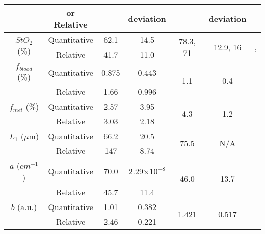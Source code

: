 \begin{subappendices}
\begin{table}[h]
\begin{tabular}{|c|ccc|ccc|}
         & or Relative &  & deviation &  & deviation &  \\
        \hline
        \multirow{2}{*}{$StO_2$ (\%)} & Quantitative & 62.1 & 14.5 & \multirow{2}{*}{78.3, 71} & \multirow{2}{*}{12.9, 16} & \multirow{2}{*}{\cite{VanManen2021}, \cite{Nishidate2011}} \\ %
        & Relative & 41.7 & 11.0 & & & \\ %
        \hline
        $f_{blood}$ (\%) & Quantitative & 0.875 & 0.443 & \multirow{2}{*}{1.1} & \multirow{2}{*}{0.4} & \multirow{2}{*}{\cite{Nishidate2011}} \\ %
        & Relative & 1.66 & 0.996 & & & \\
        \hline
        $f_{mel}$ (\%) & Quantitative & 2.57 & 3.95 & \multirow{2}{*}{4.3} & \multirow{2}{*}{1.2} & \multirow{2}{*}{\cite{Nishidate2011}} \\ %
        & Relative & 3.03 & 2.18 & & &  \\
        \hline
        $L_1$ ($\mu$m) & Quantitative & 66.2 & 20.5 & \multirow{2}{*}{75.5} & \multirow{2}{*}{N/A} & \multirow{2}{*}{\cite{Lintzeri2022}} \\ %
        & Relative & 147 & 8.74 & & &  \\
        \hline
        $a$ (\textrm{$cm^{-1}$}) & Quantitative & 70.0 & 2.29$\times 10^{-8}$ & \multirow{2}{*}{46.0} & \multirow{2}{*}{13.7} & \multirow{2}{*}{\cite{Jacques2013}} \\ %
        & Relative & 45.7 & 11.4 & & &  \\
        \hline
        $b$ (a.u.) & Quantitative & 1.01 & 0.382 & \multirow{2}{*}{1.421} & \multirow{2}{*}{0.517} & \multirow{2}{*}{\cite{Jacques2013}} \\ %
        & Relative & 2.46 & 0.221 & & &  \\
        \hline
    \end{tabular}
    \label{tb:NISTparamsuniform}
\end{table}
\end{subappendices}
